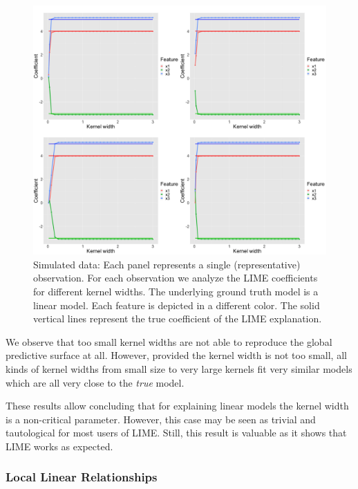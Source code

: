 \documentclass[]{krantz}
\begin{document}
\begin{figure}

{\centering \includegraphics[width=0.99\linewidth]{images/04-09-08} 

}

\caption{Simulated data: Each panel represents a single (representative) observation. For each observation we analyze the LIME coefficients for different kernel widths. The underlying ground truth model is a linear model. Each feature is depicted in a different color. The solid vertical lines represent the true coefficient of the LIME explanation.}\label{fig:lime-fig8}
\end{figure}

We observe that too small kernel widths are not able to reproduce the
global predictive surface at all. However, provided the kernel width is
not too small, all kinds of kernel widths from small size to very large
kernels fit very similar models which are all very close to the
\emph{true} model.

These results allow concluding that for explaining linear models the
kernel width is a non-critical parameter. However, this case may be seen
as trivial and tautological for most users of LIME. Still, this result
is valuable as it shows that LIME works as expected.

\subsubsection{Local Linear Relationships}\label{id412}
\end{document}
